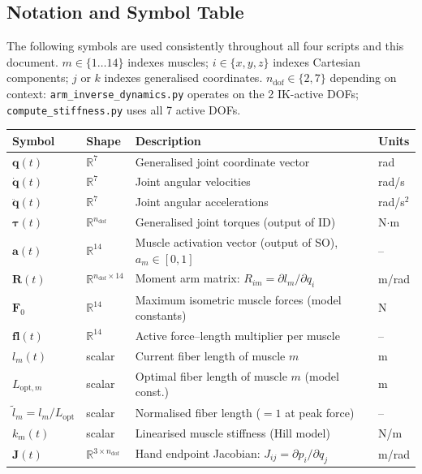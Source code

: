 \documentclass[11pt,a4paper]{article}
\newcommand{\file}[1]{\texttt{\color{PipePurple}#1}}
\newcommand{\R}{\mathbb{R}}
\newcommand{\bR}{\bm{R}}
\newcommand{\ba}{\bm{a}}
\newcommand{\bF}{\bm{F}}
\newcommand{\btau}{\bm{\tau}}
\newcommand{\bq}{\bm{q}}
\newcommand{\bJ}{\bm{J}}
\begin{document}
\subsection{Notation and Symbol Table}

The following symbols are used consistently throughout all four scripts and this document.
$m\in\{1\ldots14\}$ indexes muscles; $i\in\{x,y,z\}$ indexes Cartesian components;
$j$ or $k$ indexes generalised coordinates.
$n_\text{dof}\in\{2,7\}$ depending on context:
\file{arm\_inverse\_dynamics.py} operates on the 2 IK-active DOFs;
\file{compute\_stiffness.py} uses all 7 active DOFs.

\begin{center}
\small
\begin{tabular}{llll}
\toprule
\textbf{Symbol} & \textbf{Shape} & \textbf{Description} & \textbf{Units} \\
\midrule
\rowcolor{LightBlue}
$\bq(t)$ & $\R^7$ & Generalised joint coordinate vector & rad \\
$\dot{\bq}(t)$ & $\R^7$ & Joint angular velocities & rad/s \\
\rowcolor{LightBlue}
$\ddot{\bq}(t)$ & $\R^7$ & Joint angular accelerations & rad/s$^2$ \\
$\btau(t)$ & $\R^{n_\text{dof}}$ & Generalised joint torques (output of ID) & N$\cdot$m \\
\rowcolor{LightBlue}
$\ba(t)$ & $\R^{14}$ & Muscle activation vector (output of SO), $a_m\in[0,1]$ & -- \\
$\bR(t)$ & $\R^{n_\text{dof}\times14}$ & Moment arm matrix: $R_{im}=\partial l_m/\partial q_i$ & m/rad \\
\rowcolor{LightBlue}
$\bF_0$ & $\R^{14}$ & Maximum isometric muscle forces (model constants) & N \\
$\bm{fl}(t)$ & $\R^{14}$ & Active force--length multiplier per muscle & -- \\
\rowcolor{LightBlue}
$l_m(t)$ & scalar & Current fiber length of muscle $m$ & m \\
$L_{\text{opt},m}$ & scalar & Optimal fiber length of muscle $m$ (model const.) & m \\
\rowcolor{LightBlue}
$\tilde{l}_m = l_m/L_\text{opt}$ & scalar & Normalised fiber length ($=1$ at peak force) & -- \\
$k_m(t)$ & scalar & Linearised muscle stiffness (Hill model) & N/m \\
\rowcolor{LightBlue}
$\bJ(t)$ & $\R^{3\times n_\text{dof}}$ & Hand endpoint Jacobian: $J_{ij}=\partial p_i/\partial q_j$ & m/rad \\

\end{tabular}
\end{center}
\end{document}
